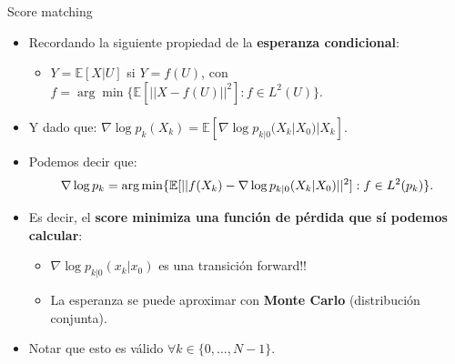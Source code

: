 \documentclass[aspectratio=169,xcolor=dvipsnames, t, spanish]{beamer}
\begin{document}
    \begin{frame}{Score matching}\vspace{-3mm}
        \begin{itemize}
            \item Recordando la siguiente propiedad de la \textbf{esperanza condicional}:
            \begin{itemize}
                \item $Y=\mathbb{E}[X|U]$ si $Y=f(U)$, con $f=\arg\min\{\mathbb{E}[||X-f(U)||^{2}]:f\in L^{2}(U)\}.$
            \end{itemize}
            \item Y dado que: \( \nabla \log p_{k}(X_{k})=\mathbb{E}[\nabla \log p_{k|0}(X_{k}|X_{0})|X_{k}] . \)
            \item Podemos decir que:
            \[ \nabla \log p_{k}=\arg\min\{\mathbb{E}[||f(X_{k})-\nabla \log p_{k|0}(X_{k}|X_{0})||^{2}]:f\in L^{2}(p_{k})\} . \vspace{-4mm}\]
            \pause \item Es decir, el \textbf{score minimiza una función de pérdida que sí podemos calcular}:
            \begin{itemize}
                \item $\nabla \log p_{k|0}(x_{k}|x_{0})$ es una transición forward!!
                \item La esperanza se puede aproximar con \textbf{Monte Carlo} (distribución conjunta).
            \end{itemize}
            \item Notar que esto es válido $\forall k\in\{0,...,N-1\}$.
        \end{itemize}
    \end{frame}
    
\end{document}
